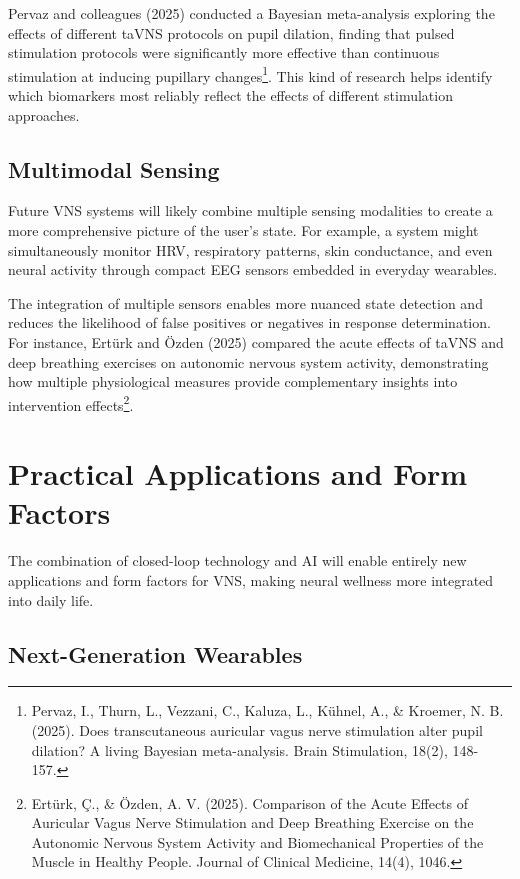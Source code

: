 \documentclass[
  Letterpaper,
]{scrbook}
\begin{document}
Pervaz and colleagues (2025) conducted a Bayesian meta-analysis
exploring the effects of different taVNS protocols on pupil dilation,
finding that pulsed stimulation protocols were significantly more
effective than continuous stimulation at inducing pupillary
changes\footnote{Pervaz, I., Thurn, L., Vezzani, C., Kaluza, L., Kühnel,
  A., \& Kroemer, N. B. (2025). Does transcutaneous auricular vagus
  nerve stimulation alter pupil dilation? A living Bayesian
  meta-analysis. Brain Stimulation, 18(2), 148-157.}. This kind of
research helps identify which biomarkers most reliably reflect the
effects of different stimulation approaches.

\subsection{Multimodal Sensing}\label{multimodal-sensing}

Future VNS systems will likely combine multiple sensing modalities to
create a more comprehensive picture of the user's state. For example, a
system might simultaneously monitor HRV, respiratory patterns, skin
conductance, and even neural activity through compact EEG sensors
embedded in everyday wearables.

The integration of multiple sensors enables more nuanced state detection
and reduces the likelihood of false positives or negatives in response
determination. For instance, Ertürk and Özden (2025) compared the acute
effects of taVNS and deep breathing exercises on autonomic nervous
system activity, demonstrating how multiple physiological measures
provide complementary insights into intervention effects\footnote{Ertürk,
  Ç., \& Özden, A. V. (2025). Comparison of the Acute Effects of
  Auricular Vagus Nerve Stimulation and Deep Breathing Exercise on the
  Autonomic Nervous System Activity and Biomechanical Properties of the
  Muscle in Healthy People. Journal of Clinical Medicine, 14(4), 1046.}.

\section{Practical Applications and Form
Factors}\label{practical-applications-and-form-factors}

The combination of closed-loop technology and AI will enable entirely
new applications and form factors for VNS, making neural wellness more
integrated into daily life.

\subsection{Next-Generation Wearables}\label{next-generation-wearables}
\end{document}

